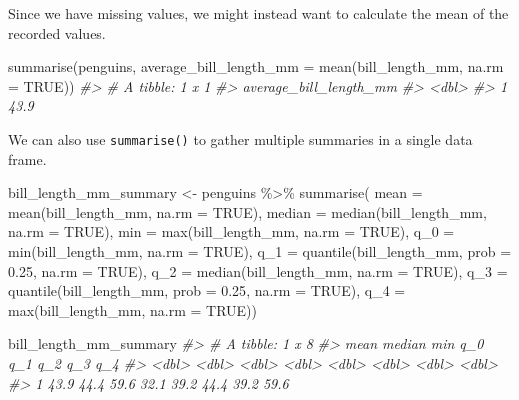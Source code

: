 \documentclass[
  12pt,
]{book}
\newenvironment{Shaded}{\begin{snugshade}}{\end{snugshade}}
\newcommand{\AttributeTok}[1]{\textcolor[rgb]{0.77,0.63,0.00}{#1}}
\newcommand{\CommentTok}[1]{\textcolor[rgb]{0.56,0.35,0.01}{\textit{#1}}}
\newcommand{\ConstantTok}[1]{\textcolor[rgb]{0.00,0.00,0.00}{#1}}
\newcommand{\FloatTok}[1]{\textcolor[rgb]{0.00,0.00,0.81}{#1}}
\newcommand{\FunctionTok}[1]{\textcolor[rgb]{0.00,0.00,0.00}{#1}}
\newcommand{\NormalTok}[1]{#1}
\newcommand{\OtherTok}[1]{\textcolor[rgb]{0.56,0.35,0.01}{#1}}
\newcommand{\SpecialCharTok}[1]{\textcolor[rgb]{0.00,0.00,0.00}{#1}}
\begin{document}
Since we have missing values, we might instead want to calculate the mean of the recorded values.

\begin{Shaded}
\begin{Highlighting}[]
\FunctionTok{summarise}\NormalTok{(penguins, }\AttributeTok{average\_bill\_length\_mm =} \FunctionTok{mean}\NormalTok{(bill\_length\_mm, }\AttributeTok{na.rm =} \ConstantTok{TRUE}\NormalTok{))}
\CommentTok{\#\textgreater{} \# A tibble: 1 x 1}
\CommentTok{\#\textgreater{}   average\_bill\_length\_mm}
\CommentTok{\#\textgreater{}                    \textless{}dbl\textgreater{}}
\CommentTok{\#\textgreater{} 1                   43.9}
\end{Highlighting}
\end{Shaded}

We can also use \texttt{summarise()} to gather multiple summaries in a single data frame.

\begin{Shaded}
\begin{Highlighting}[]
\NormalTok{bill\_length\_mm\_summary }\OtherTok{\textless{}{-}}\NormalTok{ penguins }\SpecialCharTok{\%\textgreater{}\%} 
  \FunctionTok{summarise}\NormalTok{(}
    \AttributeTok{mean =} \FunctionTok{mean}\NormalTok{(bill\_length\_mm, }\AttributeTok{na.rm =} \ConstantTok{TRUE}\NormalTok{),}
    \AttributeTok{median =} \FunctionTok{median}\NormalTok{(bill\_length\_mm, }\AttributeTok{na.rm =} \ConstantTok{TRUE}\NormalTok{),}
    \AttributeTok{min =} \FunctionTok{max}\NormalTok{(bill\_length\_mm, }\AttributeTok{na.rm =} \ConstantTok{TRUE}\NormalTok{),}
    \AttributeTok{q\_0 =} \FunctionTok{min}\NormalTok{(bill\_length\_mm, }\AttributeTok{na.rm =} \ConstantTok{TRUE}\NormalTok{),}
    \AttributeTok{q\_1 =} \FunctionTok{quantile}\NormalTok{(bill\_length\_mm, }\AttributeTok{prob =} \FloatTok{0.25}\NormalTok{, }\AttributeTok{na.rm =} \ConstantTok{TRUE}\NormalTok{),}
    \AttributeTok{q\_2 =} \FunctionTok{median}\NormalTok{(bill\_length\_mm, }\AttributeTok{na.rm =} \ConstantTok{TRUE}\NormalTok{),}
    \AttributeTok{q\_3 =} \FunctionTok{quantile}\NormalTok{(bill\_length\_mm, }\AttributeTok{prob =} \FloatTok{0.25}\NormalTok{, }\AttributeTok{na.rm =} \ConstantTok{TRUE}\NormalTok{),}
    \AttributeTok{q\_4 =} \FunctionTok{max}\NormalTok{(bill\_length\_mm, }\AttributeTok{na.rm =} \ConstantTok{TRUE}\NormalTok{))}

\NormalTok{bill\_length\_mm\_summary}
\CommentTok{\#\textgreater{} \# A tibble: 1 x 8}
\CommentTok{\#\textgreater{}    mean median   min   q\_0   q\_1   q\_2   q\_3   q\_4}
\CommentTok{\#\textgreater{}   \textless{}dbl\textgreater{}  \textless{}dbl\textgreater{} \textless{}dbl\textgreater{} \textless{}dbl\textgreater{} \textless{}dbl\textgreater{} \textless{}dbl\textgreater{} \textless{}dbl\textgreater{} \textless{}dbl\textgreater{}}
\CommentTok{\#\textgreater{} 1  43.9   44.4  59.6  32.1  39.2  44.4  39.2  59.6}
\end{Highlighting}
\end{Shaded}
\end{document}
